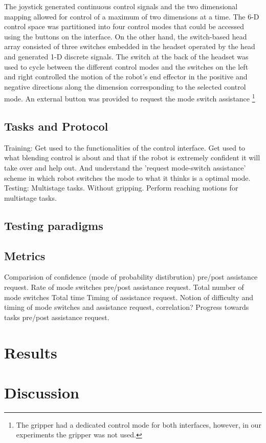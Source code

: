 The joystick generated continuous control signals and the two dimensional mapping allowed for control of a maximum of two dimensions at a time. The 6-D control space was partitioned into four control modes that could be accessed using the buttons on the interface. On the other hand, the switch-based head array consisted of three switches embedded in the headset operated by the head and generated 1-D discrete signals. The switch at the back of the headset was used to cycle between the different control modes and the switches on the left and right controlled the motion of the robot's end effector in the positive and negative directions along the dimension corresponding to the selected control mode. An external button was provided to request the mode switch assistance \footnote{The gripper had a dedicated control mode for both interfaces, however, in our experiments the gripper was not used.}
\subsection{Tasks and Protocol}
Training: Get used to the functionalities of the control interface. Get used to what blending control is about and that if the robot is extremely confident it will take over and help out.  And understand the 'request mode-switch assistance' scheme in which robot switches the mode to what it thinks is a optimal mode. 
Testing: Multistage tasks. Without gripping. Perform reaching motions for multistage tasks. 
\subsection{Testing paradigms}\label{ssec:testing_paradigms}


\subsection{Metrics}
Comparision of confidence (mode of probability distibrution) pre/post assistance request. 
Rate of mode switches pre/post assistance request. 
Total number of mode switches
Total time
Timing of assistance request. Notion of difficulty and timing of mode switches and assistance request, correlation?
Progress towards tasks pre/post assistance request. 


\section{Results}\label{sec:results}
\section{Discussion}\label{sec:discussions}
